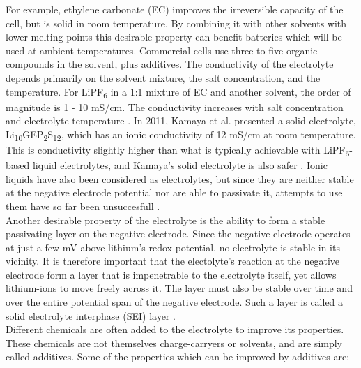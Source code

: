 \documentclass[12pt]{article} %
\begin{document}
For example, ethylene carbonate (EC) improves the irreversible capacity of the cell, but is solid in room temperature.
By combining it with other solvents with lower melting points this desirable property can benefit batteries which will be used at ambient temperatures.
Commercial cells use three to five organic compounds in the solvent, plus additives.
The conductivity of the electrolyte depends primarily on the solvent mixture, the salt concentration, and the temperature.
For LiPF\textsubscript{6} in a 1:1 mixture of EC and another solvent, the order of magnitude is 1 - 10 mS/cm.
The conductivity increases with salt concentration and electrolyte temperature \cite{reddy_thomas_section_2011-3}.
In 2011, Kamaya et al. presented a solid electrolyte, Li\textsubscript{10}GEP\textsubscript{2}S\textsubscript{12}, which has an ionic conductivity of 12 mS/cm at room temperature.
This is conductivity slightly higher than what is typically achievable with LiPF\textsubscript{6}-based liquid electrolytes, and Kamaya's solid electrolyte is also safer \cite{kamaya_lithium_2011}.
Ionic liquids have also been considered as electrolytes, but since they are neither stable at the negative electrode potential nor are able to passivate it, attempts to use them have so far been unsuccesfull \cite{blomgren_liquid_2003}.
\\
Another desirable property of the electrolyte is the ability to form a stable passivating layer on the negative electrode.
Since the negative electrode operates at just a few mV above lithium's redox potential, no electrolyte is stable in its vicinity.
It is therefore important that the electolyte's reaction at the negative electrode form a layer that is impenetrable to the electrolyte itself, yet allows lithium-ions to move freely across it.
The layer must also be stable over time and over the entire potential span of the negative electrode.
Such a layer is called a solid electrolyte interphase (SEI) layer \cite{reddy_thomas_section_2011-3}.
\\
Different chemicals are often added to the electrolyte to improve its properties.
These chemicals are not themselves charge-carryers or solvents, and are simply called additives.
Some of the properties which can be improved by additives are:
\end{document}
